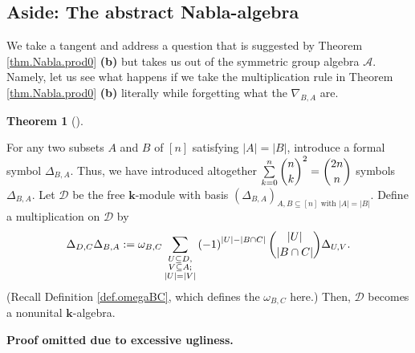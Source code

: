 \documentclass[numbers=enddot,12pt,final,onecolumn,notitlepage]{scrartcl}%
\numberwithin{exer}{subsection}
\theoremstyle{definition}
\newtheorem{theo}{Theorem}[subsection]
\newenvironment{theorem}[1][]
{\begin{theo}[#1]\begin{leftbar}}
{\end{leftbar}\end{theo}}
\let\sumnonlimits\sum
\renewcommand{\sum}{\sumnonlimits\limits}
\begin{document}
\subsection{Aside: The abstract Nabla-algebra}

We take a tangent and address a question that is suggested by Theorem
\ref{thm.Nabla.prod0} \textbf{(b)} but takes us out of the symmetric group
algebra $\mathcal{A}$. Namely, let us see what happens if we take the
multiplication rule in Theorem \ref{thm.Nabla.prod0} \textbf{(b)} literally
while forgetting what the $\nabla_{B,A}$ are.

\begin{theorem}
\label{thm.Nabla-alg.ass}For any two subsets $A$ and $B$ of $\left[  n\right]
$ satisfying $\left\vert A\right\vert =\left\vert B\right\vert $, introduce a
formal symbol $\Delta_{B,A}$. Thus, we have introduced altogether $\sum
_{k=0}^{n}\dbinom{n}{k}^{2}=\dbinom{2n}{n}$ symbols $\Delta_{B,A}$. Let
$\mathcal{D}$ be the free $\mathbf{k}$-module with basis $\left(  \Delta
_{B,A}\right)  _{A,B\subseteq\left[  n\right]  \text{ with }\left\vert
A\right\vert =\left\vert B\right\vert }$. Define a multiplication on
$\mathcal{D}$ by%
\[
\Delta_{D,C}\Delta_{B,A}:=\omega_{B,C}\sum_{\substack{U\subseteq
D,\\V\subseteq A;\\\left\vert U\right\vert =\left\vert V\right\vert }}\left(
-1\right)  ^{\left\vert U\right\vert -\left\vert B\cap C\right\vert }%
\dbinom{\left\vert U\right\vert }{\left\vert B\cap C\right\vert }\Delta
_{U,V}.
\]
(Recall Definition \ref{def.omegaBC}, which defines the $\omega_{B,C}$ here.)
Then, $\mathcal{D}$ becomes a nonunital $\mathbf{k}$-algebra.
\end{theorem}

\textbf{Proof omitted due to excessive ugliness.}
\end{document}
